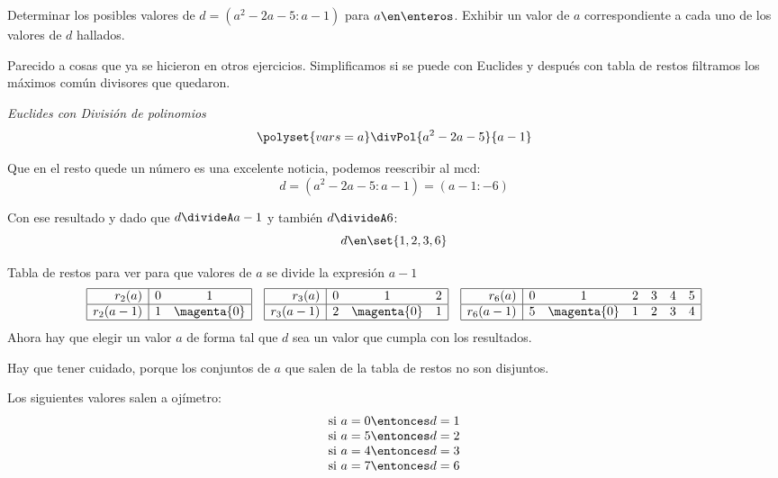 \begin{enunciado}{\ejExtra}
  Determinar los posibles valores de $d = (a^2 - 2a -5: a-1)$ para $a \en \enteros$. Exhibir un valor de $a$
  correspondiente a cada uno de los valores de $d$ hallados.
\end{enunciado}

Parecido a cosas que ya se hicieron en otros ejercicios. Simplificamos si se puede con Euclides y después con tabla de restos
filtramos los máximos común divisores que quedaron.

\bigskip

\textit{Euclides con División de polinomios}
$$
\polyset{vars=a}
  \divPol{a^2 - 2a -5}{a-1}
$$

Que en el resto quede un número es una excelente noticia, podemos reescribir al mcd:
$$
  d = (a^2 - 2a -5: a-1) = (a-1 : -6)
$$

Con ese resultado y dado que $d  \divideA a - 1$ y también $d\divideA 6$:
$$
  d \en \set{1, 2, 3, 6}
$$

Tabla de restos para ver para que valores de $a$ se divide la expresión $a-1$
$$
  \begin{array}{|r|cc|}
    \hline
    r_2(a)     & 0 & 1           \\ \hline
    r_2(a - 1) & 1 & \magenta{0} \\ \hline
  \end{array}
  \quad
  \begin{array}{|r|ccc|}
    \hline
    r_3(a)     & 0 & 1           & 2 \\ \hline
    r_3(a - 1) & 2 & \magenta{0} & 1 \\ \hline
  \end{array}
  \quad
  \begin{array}{|r|cccccc|}
    \hline
    r_6(a)     & 0 & 1           & 2 & 3 & 4 & 5 \\ \hline
    r_6(a - 1) & 5 & \magenta{0} & 1 & 2 & 3 & 4 \\ \hline
  \end{array}
$$
Ahora hay que elegir un valor $a$ de forma tal que $d$ sea un valor que cumpla con los resultados.

Hay que tener cuidado, porque los conjuntos de $a$ que salen de la tabla de restos no son disjuntos.

Los siguientes valores salen a ojímetro:
$$
  \begin{array}{c}
    \text{si } a = 0 \entonces d = 1 \\
    \text{si } a = 5 \entonces d = 2 \\
    \text{si } a = 4 \entonces d = 3 \\
    \text{si } a = 7 \entonces d = 6
  \end{array}
$$

\begin{aportes}
  \item {}
\end{aportes}
